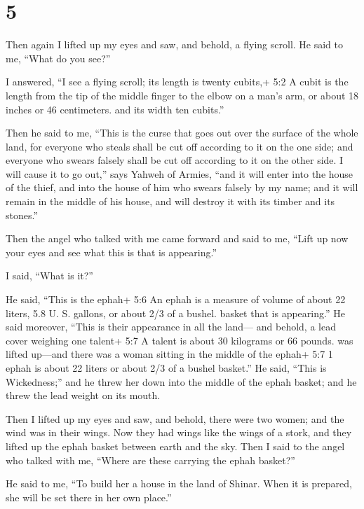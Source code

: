 \hypertarget{section-4}{%
\section{5}\label{section-4}}

 Then again I lifted up my eyes and saw, and behold, a
flying scroll.  He said to me, ``What do you see?''

I answered, ``I see a flying scroll; its length is twenty cubits,+ 5:2 A
cubit is the length from the tip of the middle finger to the elbow on a
man's arm, or about 18 inches or 46 centimeters. and its width ten
cubits.''

 Then he said to me, ``This is the curse that goes out over
the surface of the whole land, for everyone who steals shall be cut off
according to it on the one side; and everyone who swears falsely shall
be cut off according to it on the other side.  I will cause
it to go out,'' says Yahweh of Armies, ``and it will enter into the
house of the thief, and into the house of him who swears falsely by my
name; and it will remain in the middle of his house, and will destroy it
with its timber and its stones.''

 Then the angel who talked with me came forward and said to
me, ``Lift up now your eyes and see what this is that is appearing.''

 I said, ``What is it?''

He said, ``This is the ephah+ 5:6 An ephah is a measure of volume of
about 22 liters, 5.8 U. S. gallons, or about 2/3 of a bushel. basket
that is appearing.'' He said moreover, ``This is their appearance in all
the land---  and behold, a lead cover weighing one talent+
5:7 A talent is about 30 kilograms or 66 pounds. was lifted up---and
there was a woman sitting in the middle of the ephah+ 5:7 1 ephah is
about 22 liters or about 2/3 of a bushel basket.''  He said,
``This is Wickedness;'' and he threw her down into the middle of the
ephah basket; and he threw the lead weight on its mouth.

 Then I lifted up my eyes and saw, and behold, there were
two women; and the wind was in their wings. Now they had wings like the
wings of a stork, and they lifted up the ephah basket between earth and
the sky.  Then I said to the angel who talked with me,
``Where are these carrying the ephah basket?''

 He said to me, ``To build her a house in the land of
Shinar. When it is prepared, she will be set there in her own place.''

